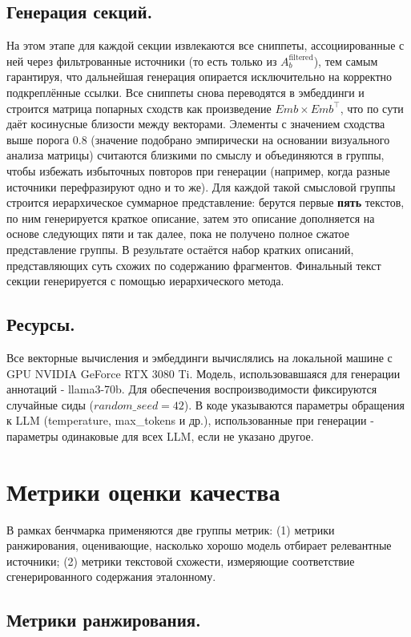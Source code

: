 \documentclass{article}
\theoremstyle{definition}
\theoremstyle{plain}
\begin{document}
\subsection*{Генерация секций.}
На этом этапе для каждой секции извлекаются все сниппеты, ассоциированные с ней через фильтрованные источники 
(то есть только из \(A_b^{\mathrm{filtered}}\)), тем самым гарантируя, что дальнейшая генерация опирается исключительно на корректно подкреплённые ссылки. 
Все сниппеты снова переводятся в эмбеддинги и строится матрица попарных сходств как произведение \(Emb \times Emb^\top\), что по сути даёт косинусные близости между векторами. 
Элементы с значением сходства выше порога 0.8 (значение подобрано эмпирически на основании визуального анализа матрицы) считаются близкими по смыслу и объединяются в группы, 
чтобы избежать избыточных повторов при генерации (например, когда разные источники перефразируют одно и то же). 
Для каждой такой смысловой группы строится иерархическое суммарное представление: 
берутся первые \textbf{пять} текстов, по ним генерируется краткое описание, затем это описание дополняется на основе следующих пяти и так далее, пока не получено полное сжатое представление группы. 
В результате остаётся набор кратких описаний, представляющих суть схожих по содержанию фрагментов. 
Финальный текст секции генерируется с помощью иерархического метода.

\subsection*{Ресурсы.}
Все векторные вычисления и эмбеддинги вычислялись на локальной машине с GPU NVIDIA GeForce RTX 3080 Ti.
Модель, использовавшаяся для генерации аннотаций - llama3-70b. 
Для обеспечения воспроизводимости фиксируются случайные сиды ($random\_seed = 42$). 
В коде указываются параметры обращения к LLM (temperature, max\_tokens и др.), использованные при генерации - параметры одинаковые для всех LLM, если не указано другое.


\section*{Метрики оценки качества}

В рамках бенчмарка применяются две группы метрик:  
(1) метрики ранжирования, оценивающие, насколько хорошо модель отбирает релевантные источники;  
(2) метрики текстовой схожести, измеряющие соответствие сгенерированного содержания эталонному.

\subsection*{Метрики ранжирования.}
\end{document}
